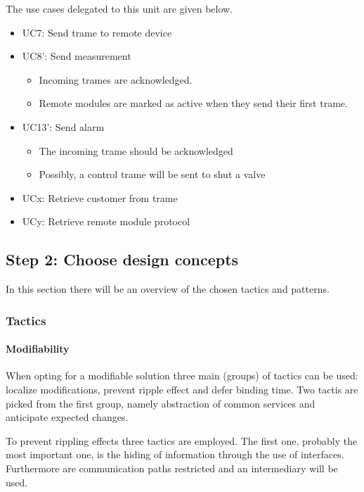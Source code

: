 \npar The use cases delegated to this unit are given below.

\begin{itemize}
	\item UC7: Send trame to remote device
	\item UC8': Send measurement
	\begin{itemize}
	    \item Incoming trames are acknowledged.
    	\item Remote modules are marked as active when they send their first trame.
  	\end{itemize}
  	\item UC13': Send alarm
  	\begin{itemize}
		\item The incoming trame should be acknowledged
		\item Possibly, a control trame will be sent to shut a valve
  	\end{itemize}
  	\item UCx: Retrieve customer from trame
  	\item UCy: Retrieve remote module protocol
\end{itemize}

\subsection{Step 2: Choose design concepts}
\label{add:it2/concepts}

\npar In this section there will be an overview of the chosen tactics and
patterns.

\subsubsection{Tactics}
\label{add:it2/tactics}

\paragraph{Modifiability}

\npar When opting for a modifiable solution three main (groups) of tactics can
be used: localize modifications, prevent ripple effect and defer binding time.
Two tactis are picked from the first group, namely abstraction of common
services and anticipate expected changes.

\npar To prevent rippling effects three tactics are employed. The first one,
probably the most important one, is the hiding of information through the use of
interfaces. Furthermore are communication paths restricted and an intermediary
will be used.


